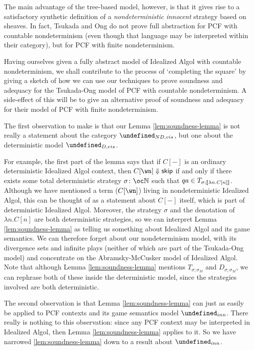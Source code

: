 \documentclass[sigplan,10pt,review]{acmart}\settopmatter{printfolios=true,printccs=false,printacmref=false}
\let\G\undefined
\begin{document}
The main advantage of the tree-based model, however, is that it gives rise to a satisfactory synthetic definition of a \emph{nondeterministic innocent} strategy based on sheaves.  
In fact, Tsukada and Ong do not prove full abstraction for PCF with countable nondeterminism (even though that language may be interpreted within their category), but for PCF with finite nondeterminism.  

Having ourselves given a fully abstract model of Idealized Algol with countable nondeterminism, we shall contribute to the process of `completing the square' by giving a sketch of how we can use our techniques to prove soundness and adequacy for the Tsukada-Ong model of PCF with countable nondeterminism.  
A side-effect of this will be to give an alternative proof of soundness and adequacy for their model of PCF with finite nondeterminism.  

The first observation to make is that our Lemma \ref{lem:soundness-lemma} is not really a statement about the category $\G_{ND,vis}$, but one about the deterministic model $\G_{D,vis}$.  

For example, the first part of the lemma says that if $C[-]$ is an ordinary deterministic Idealized Algol context, then $C[\wn]\converges\skipp$ if and only if there exists some total deterministic strategy $\sigma\from\oc\bN$ such that $qa\in T_{\sigma;\left\llbracket\lambda n.C[n]\right\rrbracket}$.  
Although we have mentioned a term ($C[\wn]$) living in nondeterministic Idealized Algol, this can be thought of as a statement about $C[-]$ itself, which is part of deterministic Idealized Algol.  
Moreover, the strategy $\sigma$ and the denotation of $\lambda n.C[n]$ are both deterministic strategies, so we can interpret Lemma \ref{lem:soundness-lemma} as telling us something about Idealized Algol and its game semantics.  
We can therefore forget about our nondeterminism model, with its divergence sets and infinite plays (neither of which are part of the Tsukada-Ong model) and concentrate on the Abramsky-McCusker model of Idealized Algol.
Note that although Lemma \ref{lem:soundness-lemma} mentions $T_{\sigma;\sigma_M}$ and $D_{\sigma;\sigma_M}$, we can rephrase both of these inside the deterministic model, since the strategies involved are both deterministic.  

The second observation is that Lemma \ref{lem:soundness-lemma} can just as easily be applied to PCF contexts and its game semantics model $\G_{inn}$.  
There really is nothing to this observation: since any PCF context may be interpreted in Idealized Algol, then Lemma \ref{lem:soundness-lemma} applies to it.
So we have narrowed \ref{lem:soundness-lemma} down to a result about $\G_{inn}$.  
\end{document}
